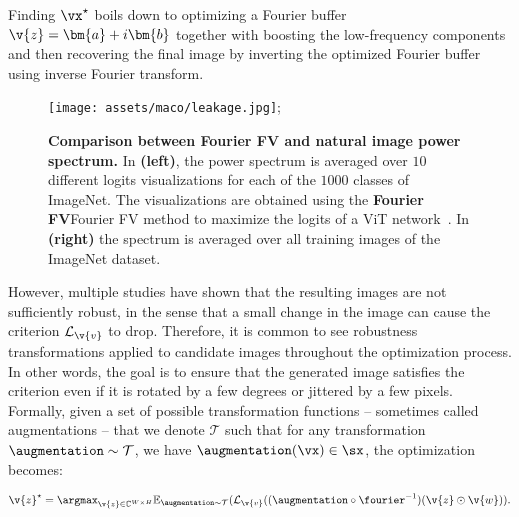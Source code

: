 Finding $\vx^\star$ boils down to optimizing a Fourier buffer
$\v{z} = \bm{a} + i \bm{b}$ together with boosting the low-frequency components and then recovering the final image by inverting the optimized Fourier buffer using inverse Fourier transform.

\begin{figure}
\centering
\texttt{[image: assets/maco/leakage.jpg]};
\caption{\textbf{Comparison between Fourier FV and natural image power spectrum.} In \textbf{(left)}, the power spectrum is averaged over $10$ different logits visualizations for each of the $1000$ classes of ImageNet. The visualizations are obtained using the \textbf{Fourier FV}Fourier FV method to maximize the logits of a ViT network~\citep{olah2017feature}. In \textbf{(right)} the spectrum is averaged over all training images of the ImageNet dataset.}
\label{fig:maco:leakage}
\end{figure}






However, multiple studies have shown that the resulting images are not sufficiently robust, in the sense that a small change in the image can cause the criterion $ \mathcal{L}_{\v{v}}$ to drop. Therefore, it is common to see robustness transformations applied to candidate images throughout the optimization process. In other words, the goal is to ensure that the generated image satisfies the criterion even if it is rotated by a few degrees or jittered by a few pixels. Formally, given a set of possible transformation functions -- sometimes called augmentations -- that we denote $\mathcal{T}$ such that for any transformation $\augmentation \sim \mathcal{T}$, we have $\augmentation(\vx) \in \sx$, the optimization becomes:

$$ 
\v{z}^\star = \argmax_{\v{z} \in \mathbb{C}^{W \times H}}
\mathbb{E}_{\augmentation \sim \mathcal{T}}(\mathcal{L}_{\v{v}}((\augmentation \circ \fourier^{-1})(\v{z} \odot \v{w})).
$$


